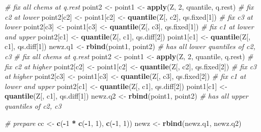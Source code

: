\documentclass[12pt, twoside]{amherstthesis}
\newenvironment{Shaded}{\begin{snugshade}}{\end{snugshade}}
\newcommand{\CommentTok}[1]{\textcolor[rgb]{0.56,0.35,0.01}{\textit{#1}}}
\newcommand{\DecValTok}[1]{\textcolor[rgb]{0.00,0.00,0.81}{#1}}
\newcommand{\FunctionTok}[1]{\textcolor[rgb]{0.13,0.29,0.53}{\textbf{#1}}}
\newcommand{\NormalTok}[1]{#1}
\newcommand{\OtherTok}[1]{\textcolor[rgb]{0.56,0.35,0.01}{#1}}
\newcommand{\SpecialCharTok}[1]{\textcolor[rgb]{0.81,0.36,0.00}{\textbf{#1}}}
\begin{document}
\begin{Shaded}
\begin{Highlighting}[]
    \CommentTok{\# fix all chems at q.rest}
\NormalTok{    point2 }\OtherTok{\textless{}{-}}\NormalTok{ point1 }\OtherTok{\textless{}{-}} \FunctionTok{apply}\NormalTok{(Z, }\DecValTok{2}\NormalTok{, quantile, q.rest)}
    \CommentTok{\# fix c2 at lower}
\NormalTok{    point2[c2] }\OtherTok{\textless{}{-}}\NormalTok{ point1[c2] }\OtherTok{\textless{}{-}} \FunctionTok{quantile}\NormalTok{(Z[, c2], qs.fixed[}\DecValTok{1}\NormalTok{])}
    \CommentTok{\# fix c3 at lower}
\NormalTok{    point2[c3] }\OtherTok{\textless{}{-}}\NormalTok{ point1[c3] }\OtherTok{\textless{}{-}} \FunctionTok{quantile}\NormalTok{(Z[, c3], qs.fixed[}\DecValTok{1}\NormalTok{])}
    \CommentTok{\# fix c1 at lower and upper}
\NormalTok{    point2[c1] }\OtherTok{\textless{}{-}} \FunctionTok{quantile}\NormalTok{(Z[, c1], qs.diff[}\DecValTok{2}\NormalTok{])}
\NormalTok{    point1[c1] }\OtherTok{\textless{}{-}} \FunctionTok{quantile}\NormalTok{(Z[, c1], qs.diff[}\DecValTok{1}\NormalTok{])}
\NormalTok{    newz.q1 }\OtherTok{\textless{}{-}} \FunctionTok{rbind}\NormalTok{(point1, point2) }\CommentTok{\# has all lower quantiles of c2, c3}
    \CommentTok{\# fix all chems at q.rest}
\NormalTok{    point2 }\OtherTok{\textless{}{-}}\NormalTok{ point1 }\OtherTok{\textless{}{-}} \FunctionTok{apply}\NormalTok{(Z, }\DecValTok{2}\NormalTok{, quantile, q.rest)}
    \CommentTok{\# fix c2 at higher}
\NormalTok{    point2[c2] }\OtherTok{\textless{}{-}}\NormalTok{ point1[c2] }\OtherTok{\textless{}{-}} \FunctionTok{quantile}\NormalTok{(Z[, c2], qs.fixed[}\DecValTok{2}\NormalTok{])}
    \CommentTok{\# fix c3 at higher}
\NormalTok{    point2[c3] }\OtherTok{\textless{}{-}}\NormalTok{ point1[c3] }\OtherTok{\textless{}{-}} \FunctionTok{quantile}\NormalTok{(Z[, c3], qs.fixed[}\DecValTok{2}\NormalTok{])}
    \CommentTok{\# fix c1 at lower and upper}
\NormalTok{    point2[c1] }\OtherTok{\textless{}{-}} \FunctionTok{quantile}\NormalTok{(Z[, c1], qs.diff[}\DecValTok{2}\NormalTok{])}
\NormalTok{    point1[c1] }\OtherTok{\textless{}{-}} \FunctionTok{quantile}\NormalTok{(Z[, c1], qs.diff[}\DecValTok{1}\NormalTok{])}
\NormalTok{    newz.q2 }\OtherTok{\textless{}{-}} \FunctionTok{rbind}\NormalTok{(point1, point2) }\CommentTok{\# has all upper quantiles of c2, c3}
    
    \CommentTok{\# prepare}
\NormalTok{    cc }\OtherTok{\textless{}{-}} \FunctionTok{c}\NormalTok{(}\SpecialCharTok{{-}}\DecValTok{1} \SpecialCharTok{*} \FunctionTok{c}\NormalTok{(}\SpecialCharTok{{-}}\DecValTok{1}\NormalTok{, }\DecValTok{1}\NormalTok{), }\FunctionTok{c}\NormalTok{(}\SpecialCharTok{{-}}\DecValTok{1}\NormalTok{, }\DecValTok{1}\NormalTok{))}
\NormalTok{    newz }\OtherTok{\textless{}{-}} \FunctionTok{rbind}\NormalTok{(newz.q1, newz.q2)}
    

\end{Highlighting}
\end{Shaded}
\end{document}
